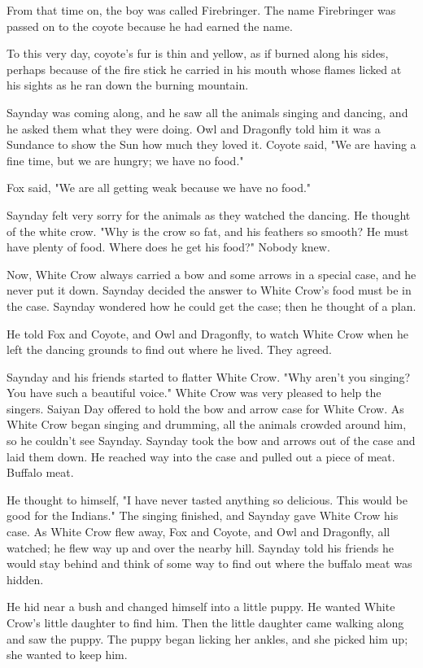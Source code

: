 From that time on, the boy was called Firebringer. The name Firebringer was passed on to the coyote because he had earned the name.

To this very day, coyote's fur is thin and yellow, as if burned along his sides, perhaps because of the fire stick he carried in his mouth whose flames licked at his sights as he ran down the burning mountain.

Saynday was coming along, and he saw all the animals singing and dancing, and he asked them what they were doing. Owl and Dragonfly told him it was a Sundance to show the Sun how much they loved it. Coyote said, "We are having a fine time, but we are hungry; we have no food."

Fox said, "We are all getting weak because we have no food."

Saynday felt very sorry for the animals as they watched the dancing. He thought of the white crow. "Why is the crow so fat, and his feathers so smooth? He must have plenty of food. Where does he get his food?" Nobody knew.

Now, White Crow always carried a bow and some arrows in a special case, and he never put it down. Saynday decided the answer to White Crow's food must be in the case. Saynday wondered how he could get the case; then he thought of a plan.

He told Fox and Coyote, and Owl and Dragonfly, to watch White Crow when he left the dancing grounds to find out where he lived. They agreed.

Saynday and his friends started to flatter White Crow. "Why aren't you singing? You have such a beautiful voice." White Crow was very pleased to help the singers. Saiyan Day offered to hold the bow and arrow case for White Crow. As White Crow began singing and drumming, all the animals crowded around him, so he couldn't see Saynday. Saynday took the bow and arrows out of the case and laid them down. He reached way into the case and pulled out a piece of meat. Buffalo meat.

He thought to himself, "I have never tasted anything so delicious. This would be good for the Indians." The singing finished, and Saynday gave White Crow his case. As White Crow flew away, Fox and Coyote, and Owl and Dragonfly, all watched; he flew way up and over the nearby hill. Saynday told his friends he would stay behind and think of some way to find out where the buffalo meat was hidden.

He hid near a bush and changed himself into a little puppy. He wanted White Crow's little daughter to find him. Then the little daughter came walking along and saw the puppy. The puppy began licking her ankles, and she picked him up; she wanted to keep him.

